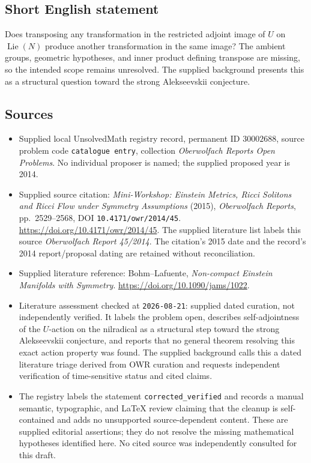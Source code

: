 \documentclass[11pt]{article}
\begin{document}
\subsection{Short English statement}
Does transposing any transformation in the restricted adjoint image of \(U\) on \(\operatorname{Lie}(N)\) produce another transformation in the same image? The ambient groups, geometric hypotheses, and inner product defining transpose are missing, so the intended scope remains unresolved. The supplied background presents this as a structural question toward the strong Alekseevskii conjecture.
\subsection{Sources}
\begin{itemize}
\item Supplied local UnsolvedMath registry record, permanent ID \(30002688\), source problem code \texttt{catalogue entry}, collection \emph{Oberwolfach Reports Open Problems}. No individual proposer is named; the supplied proposed year is 2014.
\item Supplied source citation: \emph{Mini-Workshop: Einstein Metrics, Ricci Solitons and Ricci Flow under Symmetry Assumptions} (2015), \emph{Oberwolfach Reports}, pp.\ 2529--2568, DOI \texttt{10.4171/owr/2014/45}. \url{https://doi.org/10.4171/owr/2014/45}. The supplied literature list labels this source \emph{Oberwolfach Report 45/2014}. The citation's 2015 date and the record's 2014 report/proposal dating are retained without reconciliation.
\item Supplied literature reference: Bohm--Lafuente, \emph{Non-compact Einstein Manifolds with Symmetry}. \url{https://doi.org/10.1090/jams/1022}.
\item Literature assessment checked at \texttt{2026-08-21}: supplied dated curation, not independently verified. It labels the problem open, describes self-adjointness of the \(U\)-action on the nilradical as a structural step toward the strong Alekseevskii conjecture, and reports that no general theorem resolving this exact action property was found. The supplied background calls this a dated literature triage derived from OWR curation and requests independent verification of time-sensitive status and cited claims.
\item The registry labels the statement \texttt{corrected\_verified} and records a manual semantic, typographic, and LaTeX review claiming that the cleanup is self-contained and adds no unsupported source-dependent content. These are supplied editorial assertions; they do not resolve the missing mathematical hypotheses identified here. No cited source was independently consulted for this draft.
\end{itemize}
\end{document}
